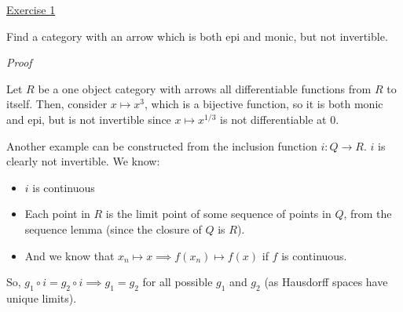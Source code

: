 \noindent
\underline{Exercise 1}
\vspace{2mm}

Find a category with an arrow which is both epi and monic, but not invertible.

\vspace{2mm}

\noindent
\emph{Proof}

Let $R$ be a one object category with arrows all differentiable functions from $R$ to itself. Then, consider $x \mapsto x^3$, which is a bijective function, so it is both monic and epi, but is not invertible since $x \mapsto x^{1/3}$ is not differentiable at $0$.

Another example can be constructed from the inclusion function $i: Q \rightarrow
R$. $i$ is clearly not invertible.
We know:
\begin{itemize}
    \item $i$ is continuous
    \item Each point in $R$ is the limit point of some sequence of points in
    $Q$, from the sequence lemma (since the closure of $Q$ is $R$).
    \item And we know that $x_n \mapsto x \implies f(x_n) \mapsto f(x)$ if $f$
    is continuous.
\end{itemize}
So, $g_1 \circ i = g_2 \circ i \implies g_1 = g_2$ for all possible $g_1$ and
$g_2$ (as Hausdorff spaces have unique limits).

\vspace{2mm}
